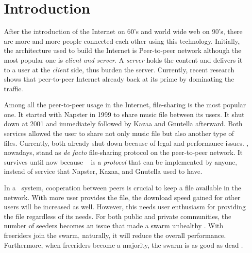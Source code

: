 \chapter{Introduction}
\label{chp:introduction}


%
%
%
%
%
After the introduction of the Internet on 60's and world wide web on 90's, there are more and more people connected each other using this technology. Initially, the architecture used to build the Internet is Peer-to-peer network although the most popular one is \textit{client and server}. A \textit{server} holds the content and delivers it to a user at the \textit{client} side, thus burden the server. Currently, recent research shows that peer-to-peer Internet already back at its prime by dominating the traffic\cite{2015:internettraffic:sandvine}.

Among all the peer-to-peer usage in the Internet, file-sharing is the most popular one. It started with Napster in 1999 to share music file between its users. It shut down at 2001 and immediately followed by Kazaa and Gnutella afterward. Both services allowed the user to share not only music file but also another type of files. Currently, both already shut down because of legal and performance issues. \bt, nowadays, stand as \textit{de facto} file-sharing protocol on the peer-to-peer network. It survives until now because \bt~ is a \textit{protocol} that can be implemented by anyone, instead of service that Napster, Kazaa, and Gnutella used to have.

In a \bt~system, cooperation between peers is crucial to keep a file available in the network. With more user provides the file, the download speed gained for other users will be increased as well. However, this needs user enthusiasm for providing the file regardless of its needs. For both public and private communities, the number of seeders becomes an issue that made a swarm unhealthy \cite{2010:pubpriv:meulpolder, 2014:sustainabilitytorrent:chen}. With freeriders join the swarm, naturally, it will reduce the overall performance. Furthermore, when freeriders become a majority, the swarm is as good as dead \cite{2000:freeridegnutella:adar}. 

